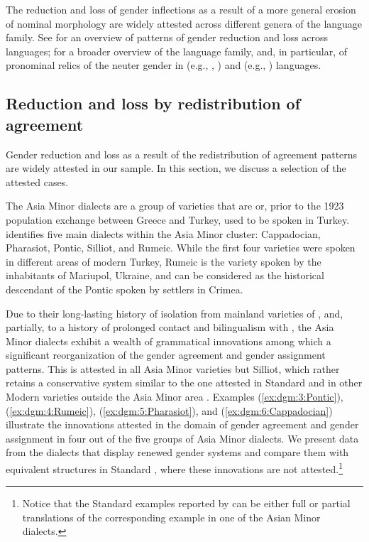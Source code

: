 \documentclass[output=collectionpaper]{langsci/langscibook}
\begin{document}
The reduction and loss of gender inflections as a result of a more general erosion of nominal morphology are widely attested across different genera of the  language family. See \citet[chapter 9]{Audring2009} for an overview of patterns of gender reduction and loss across  languages; \citet{Priestly1983} for a broader overview of the  language family, and, in particular, of pronominal relics of the neuter gender in  (e.g., , ) and  (e.g., ) languages.

\subsection{Reduction and loss by redistribution of agreement}
\label{subsubsec:semanticization}
Gender reduction and loss as a result of the redistribution of agreement patterns are widely attested in our sample. In this section, we discuss a selection of the attested cases.



The Asia Minor  dialects are a group of  varieties that are or, prior to the 1923 population exchange between Greece and Turkey, used to be spoken in Turkey. \citet{Karatsareas2014} identifies five main dialects within the Asia Minor  cluster:  Cappadocian, Pharasiot, Pontic, Silliot, and Rumeic. While the first four varieties were spoken in different areas of modern Turkey, Rumeic is the variety spoken by the  inhabitants of Mariupol, Ukraine, and can be considered as the historical descendant of the Pontic spoken by  settlers in Crimea.

\newpage 
Due to their long-lasting history of isolation from mainland varieties of , and, partially, to a history of prolonged contact and bilingualism with , the Asia Minor  dialects exhibit a wealth of grammatical innovations among which a significant reorganization of the gender agreement and gender assignment patterns. This is attested in all Asia Minor  varieties but Silliot, which rather retains a conservative system similar to the one attested in Standard  and in other Modern  varieties outside the Asia Minor area \citep[83]{Karatsareas2014}. Examples (\ref{ex:dgm:3:Pontic}), (\ref{ex:dgm:4:Rumeic}), (\ref{ex:dgm:5:Pharasiot}), and (\ref{ex:dgm:6:Cappadocian}) illustrate the innovations attested in the domain of gender agreement and gender assignment in four out of the five groups of Asia Minor  dialects. We present data from the dialects that display renewed gender systems and compare them with equivalent structures in Standard , where these innovations are not attested.\footnote{Notice that the Standard  examples reported by \citet{Karatsareas2014} can be either full or partial translations of the corresponding example in one of the Asian Minor  dialects.}
\end{document}
